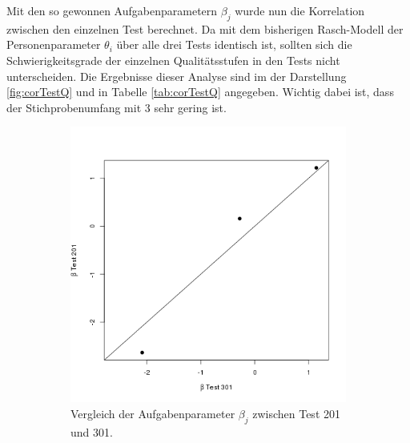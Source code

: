  Mit den so gewonnen Aufgabenparametern $\beta_j$ wurde nun die Korrelation zwischen den einzelnen Test berechnet. Da mit dem bisherigen Rasch-Modell der Personenparameter $\theta_i$ über alle drei Tests identisch ist, sollten sich die Schwierigkeitsgrade der einzelnen Qualitätsstufen in den Tests nicht unterscheiden. Die Ergebnisse dieser Analyse sind im der Darstellung \ref{fig:corTestQ} und in Tabelle \ref{tab:corTestQ} angegeben. Wichtig dabei ist, dass der Stichprobenumfang mit 3 sehr gering ist. 
 
 
  \begin{figure}[htp]
  \centering
  \begin{subfigure}{0.32\textwidth}
    \includegraphics[width=1.0\linewidth]{graphics/GOF201301.png}
    \caption{Vergleich der Aufgabenparameter $\beta_j$ zwischen Test 201 und 301.}
    \label{fig:cor201301}
  \end{subfigure}
  \begin{subfigure}{0.32\textwidth}

\end{subfigure}
\end{figure}

